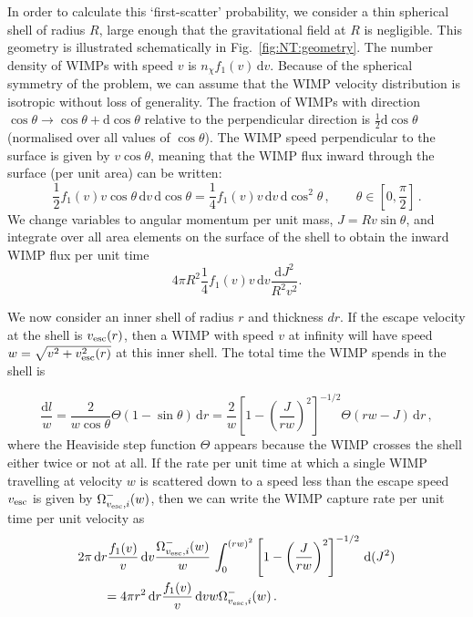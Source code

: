 In order to calculate this `first-scatter' probability, we consider a thin spherical shell of radius $R$, large enough that the gravitational field at $R$ is negligible. This geometry is illustrated schematically in Fig.~\ref{fig:NT:geometry}. The number density of WIMPs with speed $v$ is $n_\chi f_1(v) \,\mathrm{d}v$. Because of the spherical symmetry of the problem, we can assume that the WIMP velocity distribution is isotropic without loss of generality. The fraction of WIMPs with direction $\cos \theta \rightarrow \cos \theta + \textrm{d} \cos \theta$ relative to the perpendicular direction is $\frac{1}{2} \textrm{d}\cos\theta$ (normalised over all values of $\cos \theta$). The WIMP speed perpendicular to the surface is given by $v \cos\theta$, meaning that the WIMP flux inward through the surface (per unit area) can be written:
\begin{equation}
\frac{1}{2} f_1(v) v \cos\theta \,\textrm{d}v \,\textrm{d}\cos\theta = \frac{1}{4} f_1(v) v \,\textrm{d}v \,\textrm{d}\cos^2\theta \,, \qquad \theta \in [0, \frac{\pi}{2}]\,.
\end{equation}
We change variables to angular momentum per unit mass, $ J = R v \sin\theta $, and integrate over all area elements on the surface of the shell to obtain the inward WIMP flux per unit time
\begin{equation}
4 \pi R^2 \frac{1}{4}f_1(v) v \, \textrm{d}v \frac{\textrm{d}J^2}{R^2 v^2}.
\end{equation}

We now consider an inner shell of radius $r$ and thickness $dr$. If the escape velocity at the shell is $\vesc(r)$, then a WIMP with speed $v$ at infinity will have speed $w = \sqrt{v^2 + \vesc^2(r)}$ at this inner shell. The total time the WIMP spends in the shell is

\begin{equation}
\frac{\textrm{d}l}{w} = \frac{2}{w \cos \theta} \Theta(1 - \sin\theta) \, \textrm{d}r = \frac{2}{w}\left[ 1 - \left(\frac{J}{rw}\right)^2\right]^{-1/2} \Theta(rw - J) \, \textrm{d}r\,,
\end{equation}
where the Heaviside step function $\Theta$ appears because the WIMP crosses the shell either twice or not at all. If the rate per unit time at which a single WIMP travelling at velocity \(w\) is scattered down to a speed less than the escape speed \(\vesc\) is given by \(\Omega^{-}_{\vesc,i}(w)\), then we can write the WIMP capture rate per unit time per unit velocity as
\begin{align}
&2\pi \, \textrm{d}r \frac{f_1(v)}{v}\,\textrm{d}v \frac{\ScatRate}{w}  \, \int_{0}^{(rw)^2} \left[ 1 - \left(\frac{J}{rw}\right)^2\right]^{-1/2} \, \textrm{d}(J^2) \nonumber\\&\qquad= 4 \pi r^2 \, \textrm{d}r \frac{f_1(v)}{v}\, \textrm{d}v w \ScatRate\,.
\end{align}

